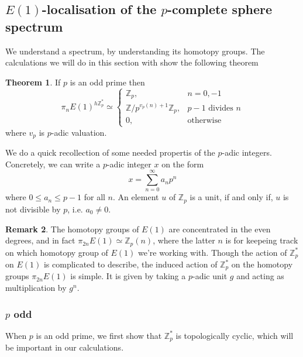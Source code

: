 \documentclass[a4paper]{article} %
\theoremstyle{definition}
\newtheorem{theorem}{Theorem} %
\newtheorem{remark}[theorem]{Remark}
\newcommand{\Z}{\mathbb{Z}}
\begin{document}
\subsection{$E(1)$-localisation of the $p$-complete sphere spectrum}

We understand a spectrum, by understanding its homotopy groups. The calculations we will do in this section with show the following theorem
\begin{theorem}
 If $p$ is an odd prime  then
 \[
  \pi_n E(1)^{h\Z_p^*} \simeq
    \begin{cases}
    \Z_p, & n=0,-1 \\
    \Z/p^{v_p(n)+1}\Z_p, & p-1 \text{ divides } n \\
    0, & \text{otherwise}
    \end{cases}
  \]
  where $v_p$ is $p$-adic valuation.
\end{theorem}

We do a quick recollection of some needed propertis of the $p$-adic integers.  Concretely, we can write a $p$-adic integer $x$ on the form
\[
  x=\sum_{n = 0}^\infty a_n p^n
\]
where $ 0 \le a_n \le p-1$ for all $n$.
An element $u$ of $\Z_p$ is a unit, if and only if, $u$ is not divisible by $p$, i.e. $a_0 \neq 0$.

\begin{remark}
  The homotopy groups of $E(1)$ are concentrated in the even degrees, and in fact $\pi_{2n}E(1) \simeq \Z_p(n)$, where the latter $n$ is for keepeing track on which homotopy group of $E(1)$ we're working with. Though the action of $\Z_p^*$ on $E(1)$ is complicated to describe, the induced action of $\Z_p^*$ on the homotopy groups $\pi_{2n}E(1)$ is simple. It is given by taking a $p$-adic unit $g$ and acting as multiplication by $g^n$.
\end{remark}

\subsubsection{$p$ odd}

When $p$ is an odd prime, we first show that $\Z_p^*$ is topologically cyclic, which will be important in our calculations.
\end{document}
